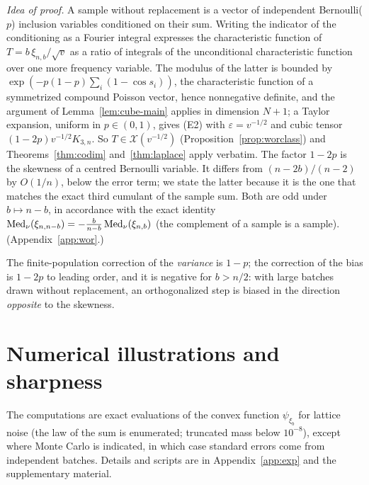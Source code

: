 \documentclass[anon,12pt]{colt2026}
\begin{document}
\begin{theorem}\label{thm:wor}\StmtWor\end{theorem}

\noindent\emph{Idea of proof.} A sample without replacement is a vector of independent Bernoulli($p$) inclusion variables
conditioned on their sum. Writing the indicator of the conditioning as a Fourier integral expresses the characteristic
function of $T=b\,\xi_{n,b}/\sqrt v$ as a ratio of integrals of the unconditional characteristic function over one more
frequency variable. The modulus of the latter is bounded by $\exp(-p(1-p)\sum_i(1-\cos s_i))$, the characteristic
function of a symmetrized compound Poisson vector, hence nonnegative definite, and the argument of
Lemma~\ref{lem:cube-main} applies in dimension $N+1$; a Taylor expansion, uniform in $p\in(0,1)$, gives \textup{(E2)}
with $\varepsilon=v^{-1/2}$ and cubic tensor $(1-2p)v^{-1/2}K_{3,n}$. So $T\in\mathcal X(v^{-1/2})$
(Proposition~\ref{prop:worclass}) and Theorems~\ref{thm:codim} and~\ref{thm:laplace} apply verbatim. The factor
$1-2p$ is the skewness of a centred Bernoulli variable. It differs from $(n-2b)/(n-2)$ by $O(1/n)$, below the error
term; we state the latter because it is the one that matches the exact third cumulant of the sample sum. Both are
odd under $b\mapsto n-b$, in accordance with the exact identity $\operatorname{Med}_\nu(\xi_{n,n-b})=-\frac b{n-b}\operatorname{Med}_\nu(\xi_{n,b})$
(the complement of a sample is a sample). (Appendix~\ref{app:wor}.)

\smallskip
The finite-population correction of the \emph{variance} is $1-p$; the correction of the bias is $1-2p$ to leading
order, and it is negative for $b>n/2$: with large batches drawn without replacement, an orthogonalized step is biased
in the direction \emph{opposite} to the skewness.

\section{Numerical illustrations and sharpness}\label{sec:exp}

The computations are exact evaluations of the convex function $\psi_{\xi_b}$ for lattice noise (the law of the sum is
enumerated; truncated mass below $10^{-8}$), except where Monte Carlo is indicated, in which case standard errors come
from independent batches. Details and scripts are in Appendix~\ref{app:exp} and the supplementary material.
\end{document}
